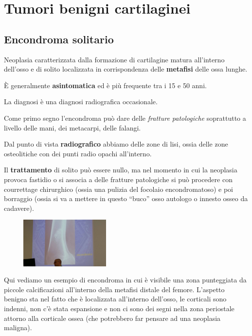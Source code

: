 \section{Tumori benigni cartilaginei}

\subsection{Encondroma solitario}

Neoplasia caratterizzata dalla formazione di cartilagine matura all'interno dell'osso e di solito localizzata in corrispondenza delle \textbf{metafisi} delle ossa lunghe.

È generalmente \textbf{asintomatica} ed è più frequente tra i 15 e 50 anni.

La diagnosi è una diagnosi radiografica occasionale.

Come primo segno l'encondroma può dare delle \emph{fratture patologiche} soprattutto a livello delle mani, dei metacarpi, delle falangi.

Dal punto di vista \textbf{radiografico} abbiamo delle zone di lisi, ossia delle zone osteolitiche con dei punti radio opachi all'interno.

Il \textbf{trattamento} di solito può essere nullo, ma nel momento in cui la neoplasia provoca fastidio o si associa a delle fratture patologiche si può procedere con courrettage chirurghico (ossia una pulizia del focolaio encondromatoso) e poi borraggio (ossia si va a mettere in questo ``buco'' osso autologo o innesto osseo da cadavere).

\begin{figure}[!ht]
\centering
\includegraphics[width=0.4\textwidth]{011/image1.jpeg}
\end{figure}

Qui vediamo un esempio di encondroma in cui è visibile una zona punteggiata da piccole calcificazioni all'interno della metafisi distale del femore. L'aspetto benigno sta nel fatto che è localizzata all'interno dell'osso, le corticali sono indenni, non c'è stata espansione e non ci sono dei segni nella zona periostale attorno alla corticale ossea (che potrebbero far pensare ad una neoplasia maligna).

